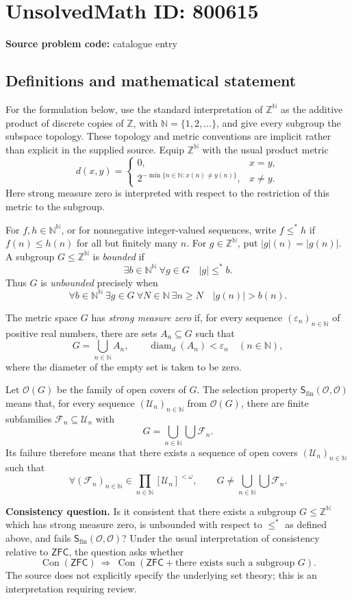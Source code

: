 \documentclass[11pt]{article}
\newcommand{\N}{\mathbb{N}}
\newcommand{\Z}{\mathbb{Z}}
\begin{document}
\section*{UnsolvedMath ID: 800615}
\textbf{Source problem code:} catalogue entry
\subsection{Definitions and mathematical statement}
For the formulation below, use the standard interpretation of $\Z^{\N}$ as the additive product of discrete copies of $\Z$, with $\N=\{1,2,\ldots\}$, and give every subgroup the subspace topology. These topology and metric conventions are implicit rather than explicit in the supplied source. Equip $\Z^{\N}$ with the usual product metric
\[
d(x,y)=\begin{cases}0,&x=y,\\2^{-\min\{n\in\N:x(n)\ne y(n)\}},&x\ne y.\end{cases}
\]
Here strong measure zero is interpreted with respect to the restriction of this metric to the subgroup.

For $f,h\in\N^{\N}$, or for nonnegative integer-valued sequences, write $f\leq^*h$ if $f(n)\leq h(n)$ for all but finitely many $n$. For $g\in\Z^{\N}$, put $|g|(n)=|g(n)|$. A subgroup $G\leq\Z^{\N}$ is \emph{bounded} if
\[
\exists b\in\N^{\N}\ \forall g\in G\quad |g|\leq^*b.
\]
Thus $G$ is \emph{unbounded} precisely when
\[
\forall b\in\N^{\N}\ \exists g\in G\ \forall N\in\N\ \exists n\geq N\quad |g(n)|>b(n).
\]

The metric space $G$ has \emph{strong measure zero} if, for every sequence $(\varepsilon_n)_{n\in\N}$ of positive real numbers, there are sets $A_n\subseteq G$ such that
\[
G=\bigcup_{n\in\N}A_n,
\qquad \operatorname{diam}_d(A_n)<\varepsilon_n\quad(n\in\N),
\]
where the diameter of the empty set is taken to be zero.

Let $\mathcal O(G)$ be the family of open covers of $G$. The selection property $\mathsf S_{\mathrm{fin}}(\mathcal O,\mathcal O)$ means that, for every sequence $(\mathcal U_n)_{n\in\N}$ from $\mathcal O(G)$, there are finite subfamilies $\mathcal F_n\subseteq\mathcal U_n$ with
\[
G=\bigcup_{n\in\N}\bigcup\mathcal F_n.
\]
Its failure therefore means that there exists a sequence of open covers $(\mathcal U_n)_{n\in\N}$ such that
\[
\forall (\mathcal F_n)_{n\in\N}\in\prod_{n\in\N}[\mathcal U_n]^{<\omega},\qquad
G\ne\bigcup_{n\in\N}\bigcup\mathcal F_n.
\]

\textbf{Consistency question.} Is it consistent that there exists a subgroup $G\leq\Z^{\N}$ which has strong measure zero, is unbounded with respect to $\leq^*$ as defined above, and fails $\mathsf S_{\mathrm{fin}}(\mathcal O,\mathcal O)$? Under the usual interpretation of consistency relative to $\mathsf{ZFC}$, the question asks whether
\[
\operatorname{Con}(\mathsf{ZFC})\ \Longrightarrow\
\operatorname{Con}\!\left(\mathsf{ZFC}+\text{there exists such a subgroup }G\right).
\]
The source does not explicitly specify the underlying set theory; this is an interpretation requiring review.
\end{document}
